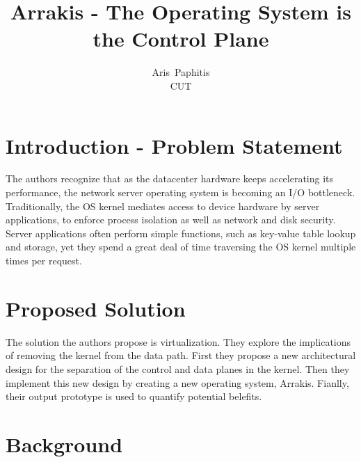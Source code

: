 \documentclass[letterpaper,twocolumn,10pt]{article}
\begin{document}
\date{}

\title{\Large \bf Arrakis - The Operating System is the Control Plane}

\author{
{\rm Aris\ Paphitis}\\
CUT
} %

\maketitle

\thispagestyle{empty}

\section{Introduction - Problem Statement} The authors recognize that as the datacenter
hardware keeps accelerating its performance, the network server operating system is
becoming an I/O bottleneck. Traditionally, the OS kernel mediates access to device
hardware by server applications, to enforce process isolation as well as network and disk
security. Server applications often perform simple functions, such as key-value table
lookup and storage, yet they spend a great deal of time traversing the OS kernel multiple
times per request.

\section{Proposed Solution} The solution the authors propose is
virtualization. They explore the implications of removing the kernel
from the data path. First they propose a new architectural design for the separation of
the control and data planes in the kernel. Then they implement this new design by creating
a new operating system, Arrakis. Fianlly, their output prototype is used to quantify
potential belefits.

\section{Background}
\end{document}
